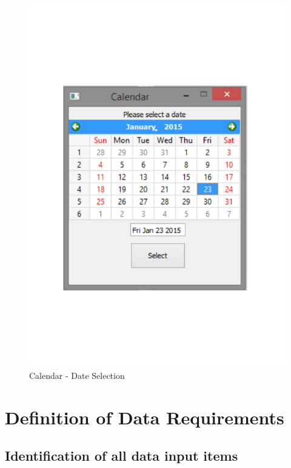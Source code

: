 \begin{figure}[H]
    \caption{Calendar - Date Selection} \label{Calendar_2.pdf}
    \includegraphics[width=\textwidth]{./Design/Calendar_2.pdf}
\end{figure}

\section{Definition of Data Requirements}

\subsection{Identification of all data input items}

